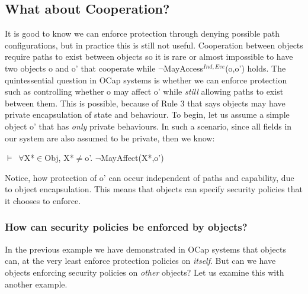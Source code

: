 \documentclass[a4paper,11pt, twoside,twocolumn]{article}
\newenvironment{logic}[1][]
{\begin{flushleft} \small }
{\end{flushleft}}
\newcommand{\loin}{$\in$}
\newcommand{\loforall}{$\forall$}
\newcommand{\loneq} {$\neq$}
\newcommand{\loturns} {$\vDash$}
\newcommand{\loneg}{$\boldsymbol \neg$}
\begin{document}
\subsection{What about Cooperation?}
It is good to know we can enforce protection through denying possible path configurations, but in practice this is still not useful. Cooperation between objects require paths to exist between objects so it is rare or almost impossible to have two objects o and o' that cooperate while \loneg MayAccess$^{Ind,Eve}$(o,o') holds. The quintessential question in OCap systems is whether we can enforce protection such as controlling whether o may affect o' while \textit{still} allowing paths to exist between them. This is possible, because of Rule 3 that says objects may have private encapsulation of state and behaviour. To begin, let us assume a simple object o' that has \textit{only} private behaviours. In such a scenario, since all fields in our system are also assumed to be private, then we know:
\begin{logic} \loturns\ \loforall X*\loin Obj, X*\loneq o'. \loneg MayAffect(X*,o') \end{logic}
Notice, how protection of o' can occur independent of paths and capability, due to object encapsulation. This means that objects can specify security policies that it chooses to enforce.

\subsubsection{How can security policies be enforced by objects?}
In the previous example we have demonstrated in OCap systems that objects can, at the very least enforce protection policies on \textit{itself}. But can we have objects enforcing security policies on \textit{other} objects? Let us examine this with another example.\\
\end{document}
